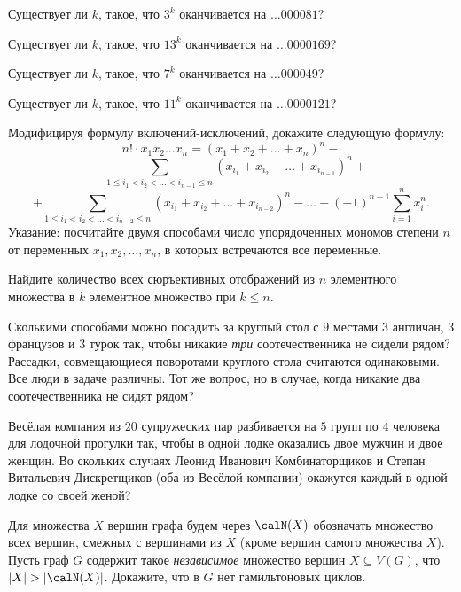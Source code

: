 Существует ли $k$, такое, что $3^k$ оканчивается на $\ldots000081$?

Существует ли $k$, такое, что ${13}^k$ оканчивается на $\ldots0000169$?

Существует ли $k$, такое, что $7^k$ оканчивается на $\ldots000049$?

Существует ли $k$, такое, что ${11}^k$ оканчивается на $\ldots0000121$?

Модифицируя формулу включений-исключений, докажите следующую формулу:
\[n! \cdot x_1 x_2\ldots x_n = (x_1 + x_2+ \ldots + x_n)^n -\]
\[- \sum_{1 \leqslant i_1<i_2<\ldots < i_{n-1} \leqslant n} (x_{i_1} + x_{i_2}+ \ldots + x_{i_{n-1}})^n +\]
\[+ \sum_{1\leqslant i_1<i_2<\ldots < i_{n-2} \leqslant n} (x_{i_1} + x_{i_2}+ \ldots + x_{i_{n-2}})^n - \ldots + (-1)^{n-1} \sum_{i=1}^n x_i^n.\]
Указание: посчитайте двумя способами число упорядоченных мономов степени $n$ от переменных $x_1,x_2,\ldots,x_n$, в которых встречаются все переменные.

Найдите количество всех сюръективных отображений из $n$ элементного множества в $k$ элементное множество при $k\leqslant n$.


Сколькими способами можно посадить за круглый стол с $9$ местами $3$ англичан, $3$ французов и $3$ турок так, чтобы никакие \emph{три} соотечественника не сидели рядом? Рассадки, совмещающиеся поворотами круглого стола считаются одинаковыми. Все люди в задаче различны. Тот же вопрос, но в случае, когда никакие два соотечественника не сидят рядом?

Весёлая компания из $20$ супружеских пар разбивается на $5$ групп по $4$ человека для лодочной прогулки так, чтобы в одной лодке оказались двое мужчин и двое женщин. Во скольких случаях Леонид Иванович Комбинаторщиков и Степан Витальевич Дискретщиков (оба из Весёлой компании) окажутся каждый в одной лодке со своей женой?

Для множества $X$ вершин графа будем через $\calN(X)$ обозначать множество всех вершин, смежных с  вершинами из $X$ (кроме вершин самого множества $X$).
Пусть граф $G$ содержит такое \emph{независимое} множество вершин $X\subseteq V(G)$, что $|X|>|\calN(X)|$. Докажите, что в $G$ нет гамильтоновых циклов.

